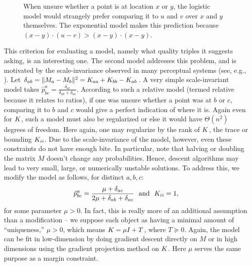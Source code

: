 \documentclass{article}
\begin{document}
\begin{figure}
 \caption{\label{fig:exp} When unsure whether a point is at location $x$ or $y$, the logistic model would strangely prefer comparing it to $u$ and $v$ over $x$ and $y$ themselves.  The exponential model makes this prediction because $(x-y) \cdot (u-v) > (x-y)\cdot (x-y)$.}
\end{figure}

This criterion for evaluating a model, namely what quality triples it suggests asking, is an interesting one.  The second model addresses this problem, and is motivated by the scale-invariance observed in many perceptual systems (see, e.g., \citealp{CB99}).  Let $\delta_{ab} = \|M_a-M_b\|^2=\S_{aa}+\S_{bb}-\S_{ab}$.  A very simple scale-invariant model takes $\hat{p}^a_{bc} = \frac{\delta_{ac}}{\delta_{ab}+\delta_{ac}}$.  According to such a relative model (termed relative because it relates to ratios), if one was unsure whether a point was at $b$ or $c$, comparing it to $b$ and $c$ would give a perfect indication of where it is.  Again even for $\S$, such a model must also be regularized or else it would have $\Theta(n^2)$ degrees of freedom.  Here again, one may regularize by the rank of $\S$, the trace or bounding $\S_{ii}$.  Due to the scale-invariance of the model, however, even these constraints do not have enough bite.  In particular, note that halving or doubling the matrix $M$ doesn't change any probabilities.  Hence, descent algorithms may lead to very small, large, or numerically unstable solutions.  To address this, we modify the model as follows, for distinct $a,b,c$:
\begin{equation}
\label{eq:rel}
\hat{p}^a_{bc} =  \frac{\mu+\delta_{ac}}{2\mu+\delta_{ab}+\delta_{ac}} \ \textrm{ and }\  \S_{ii}=1,
\end{equation}
for some parameter $\mu>0$.  In fact, this is really more of an additional assumption than a modification --  we suppose each object as having a minimal amount of ``uniqueness,'' $\mu>0$, which means $\S = \mu I + T$, where $T \succeq 0$.  Again, the model can be fit in low-dimension by doing gradient descent directly on $M$ or in high dimensions using the gradient projection method on $\S$.  Here $\mu$ serves the same purpose as a margin constraint.
\end{document}
